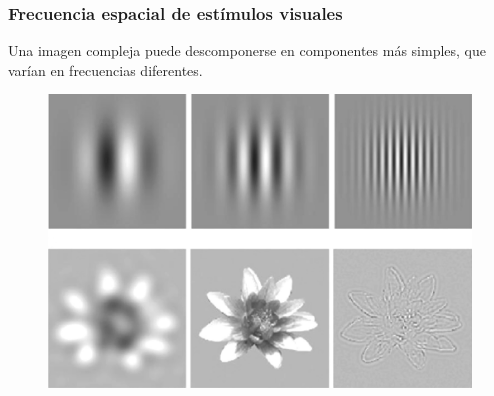 \documentclass[
11pt, %
%
aspectratio=169, %
]{beamer}
\begin{document}
     
    
     
     \begin{frame}
     	\frametitle{Frecuencia espacial de est\'imulos visuales}
     
     	
     	Una imagen compleja puede descomponerse en componentes más simples, que varían en frecuencias diferentes.
     
    	\begin{figure}[h!]
    		\centering
    	   	\includegraphics[scale=0.3]{Graphics/sp}
    	\end{figure} 	
     	
     	
     \end{frame}
	
\end{document}
